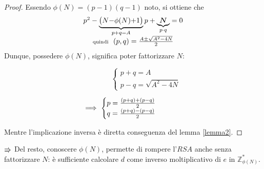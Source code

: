 \documentclass[twoside,symmetric,justified,openany,nobib]{tufte-book}
\makeatletter
\DeclareRobustCommand{\textsupsub}[2]{
  \m@th\ensuremath{
    ^{\mbox{\fontsize\sf@size\z@#1}}
    _{#2}
  }
}
\makeatother
\begin{document}
\begin{proof}
  Essendo $\phi(N){=}(p{-}1)(q{-}1)$ noto, si ottiene che
  \begin{equation}
    \label{stima}
    \begin{array}{c}
      p^{2}-\underbrace{\bigl(N{-}\phi(N){+}1\bigr)}_{p+q=A}p+\tiny\underbrace{\scalebox{2}{$N$}}_{p\cdot q}=0\\
      \text{\scriptsize quindi}\ \
      (p,q)=\frac{A\pm\sqrt{A^{2}-4N}}{2}
    \end{array}
  \end{equation}
  Dunque, possedere $\phi(N)$, significa poter fattorizzare $N$:

  \begin{minipage}[b]{0.45\linewidth}
    \[
      \hspace{45pt}{\begin{cases}
        p{+}q=A\\
        p{-}q=\sqrt{A^{2}-4N}
      \end{cases}}
    \]
  \end{minipage}
  \begin{minipage}[b]{0.45\linewidth}
    \[
      \hspace{-25pt}{\Longrightarrow\
      \begin{cases}
        p=\frac{(p+q)+(p-q)}{2}\\
        q=\frac{(p+q)-(p-q)}{2}
      \end{cases}}
    \]
  \end{minipage}

  \bigskip
  \noindent
  Mentre l'implicazione inversa è diretta conseguenza del lemma \ref{lemma2}.
\end{proof}

\noindent
$\rotatebox[origin=c]{0}{$\Rrightarrow$}$
Del resto, conoscere $\phi(N)$, permette di rompere l'$RSA$ anche senza fattorizzare $N$: è sufficiente calcolare $d$ come inverso moltiplicativo di $e$ in $\mathbb{Z}^{*}_{\phi(N)}$.

\end{document}
